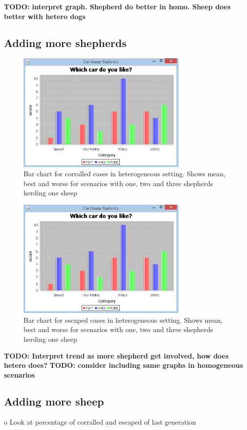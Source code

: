 \documentclass[conference]{IEEEtran}
\begin{document}
\textbf{TODO: interpret graph. Shepherd do better in homo. Sheep does better with hetero dogs}


\subsection{Adding more shepherds}

\begin{figure}[ht]
	\centering
	\includegraphics[width=3.3in]{imgs/barchart.jpg}
	\caption{Bar chart for corralled cases in heterogeneous setting. Shows mean, best and worse for scenarios with one, two and three shepherds herding one sheep}
	\label{fig:corralled_oneSheep}
\end{figure}

\begin{figure}[ht]
	\centering
	\includegraphics[width=3.3in]{imgs/barchart.jpg}
	\caption{Bar chart for escaped cases in heterogeneous setting. Shows mean, best and worse for scenarios with one, two and three shepherds herding one sheep}
	\label{fig:escaped_oneSheep}
\end{figure}

\textbf{TODO: Interpret trend as more shepherd get involved, how does hetero does?}
\textbf{TODO: consider including same graphs in homogeneous scenarios}


\subsection{Adding more sheep}
o	Look at percentage of corralled and escaped of last generation
\end{document}
